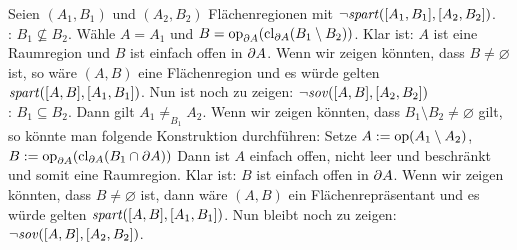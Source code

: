     \begin{bewidee}
        Seien $(A_1,B_1)$ und $(A_2,B_2)$ Flächenregionen mit $\neg \mathit{spart}([A_1,B_1],[A_2,B_2])$.\\
    
        : $B_1 \nsubseteq B_2$. 
            Wähle $A = A_1$ und $B = \text{op}_{\partial A}(\text{cl}_{\partial A}(B_1 \setminus B_2))$.
            Klar ist: $A$ ist eine Raumregion und $B$ ist einfach offen in $\partial A$.
            Wenn wir zeigen könnten, dass $B \neq \varnothing$ ist, so wäre $(A,B)$ eine Flächenregion und es würde gelten $\mathit{spart}([A,B],[A_1,B_1])$.
            Nun ist noch zu zeigen: $\neg \mathit{sov}([A,B],[A_2,B_2])$\\
        
        : $B_1 \subseteq B_2$.
            Dann gilt $A_1 \neq_{B_1} A_2$.
            Wenn wir zeigen könnten, dass $B_1 \setminus B_2 \neq \varnothing$ gilt, so könnte man folgende Konstruktion durchführen:
            Setze $A := \text{op}(A_1 \setminus A_2)$, $B := \text{op}_{\partial A}(\text{cl}_{\partial A}(B_1 \cap \partial A))$
            Dann ist $A$ einfach offen, nicht leer und beschränkt und somit eine Raumregion.
            Klar ist: $B$ ist einfach offen in $\partial A$. 
            Wenn wir zeigen könnten, dass $B \neq \varnothing$ ist, dann wäre $(A,B)$ ein Flächenrepräsentant und es würde gelten $\mathit{spart}([A,B],[A_1,B_1])$.
            Nun bleibt noch zu zeigen: $\neg \mathit{sov}([A,B],[A_2,B_2])$.
                
    \end{bewidee}

    



